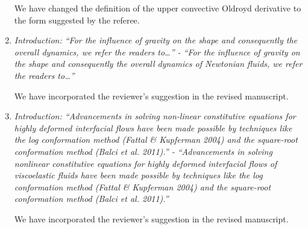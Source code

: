\documentclass[]{article}
\begin{document}
\begin{enumerate}
We have changed the definition of the upper convective Oldroyd derivative to the form suggested by the referee.

 \item \textit{Introduction: ``For the influence of gravity on the shape and consequently the overall dynamics, we refer the readers to…” - ``For the influence of gravity on the shape and consequently the overall dynamics of Newtonian fluids, we refer the readers to…”}

We have incorporated the reviewer's suggestion in the revised manuscript.

\item \textit{Introduction: ``Advancements in solving non-linear constitutive equations for highly deformed interfacial flows have been made possible by techniques like the log conformation method (Fattal \& Kupferman 2004) and the square-root conformation method (Balci et al. 2011).” - ``Advancements in solving nonlinear constitutive equations for highly deformed interfacial flows of viscoelastic fluids have been made possible by techniques like the log conformation method (Fattal \& Kupferman 2004) and the square-root conformation method (Balci et al. 2011).”}

We have incorporated the reviewer's suggestion in the revised manuscript.
\end{enumerate}

\printbibliography
\end{document}
